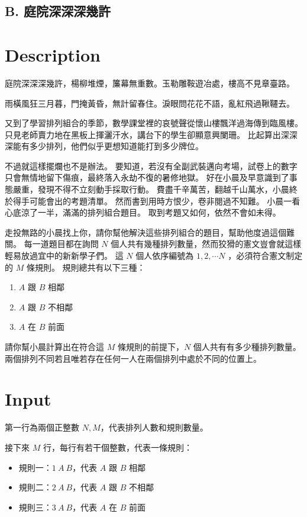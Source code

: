 \documentclass[11pt,a4paper]{article}
\begin{document}
\begin{center}
\section*{B. 庭院深深深幾許}
\end{center}

\section*{Description}

庭院深深深幾許，楊柳堆煙，簾幕無重數。玉勒雕鞍遊冶處，樓高不見章臺路。

雨橫風狂三月暮，門掩黃昏，無計留春住。淚眼問花花不語，亂紅飛過鞦韆去。

\vspace{1cm}
又到了學習排列組合的季節，數學課堂裡的哀號聲從懷山樓飄洋過海傳到臨風樓。
只見老師賣力地在黑板上揮灑汗水，講台下的學生卻顯意興闌珊。
比起算出深深深能有多少排列，他們似乎更想知道能打到多少牌位。

不過就這樣擺爛也不是辦法。
要知道，若沒有全副武裝邁向考場，試卷上的數字只會無情地留下傷痕，最終落入永劫不復的暑修地獄。
好在小晨及早意識到了事態嚴重，發現不得不立刻動手採取行動。
費盡千辛萬苦，翻越千山萬水，小晨終於得手可能會出的考題清單。
然而書到用時方恨少，卷非閱過不知難。
小晨一看心底涼了一半，滿滿的排列組合題目。
取到考題又如何，依然不會如未得。

走投無路的小晨找上你，請你幫他解決這些排列組合的題目，幫助他度過這個難關。
每一道題目都在詢問 $N$ 個人共有幾種排列數量，然而狡猾的憲文豈會就這樣輕易放過宜中的新新學子們。
這 $N$ 個人依序編號為 $1, 2, \cdots N$ ，必須符合憲文制定的 $M$ 條規則。
規則總共有以下三種：
\begin{enumerate}
	\item $A$ 跟 $B$ 相鄰
	\item $A$ 跟 $B$ 不相鄰
	\item $A$ 在 $B$ 前面
\end{enumerate}
請你幫小晨計算出在符合這 $M$ 條規則的前提下，$N$ 個人共有有多少種排列數量。
兩個排列不同若且唯若存在任何一人在兩個排列中處於不同的位置上。


\section*{Input}

第一行為兩個正整數 $N, M$，代表排列人數和規則數量。

接下來 $M$ 行，每行有若干個整數，代表一條規則：
\begin{itemize}
  \item 規則一：$1\ A\ B$，代表 $A$ 跟 $B$ 相鄰
  \item 規則二：$2\ A\ B$，代表 $A$ 跟 $B$ 不相鄰
  \item 規則三：$3\ A\ B$，代表 $A$ 在 $B$ 前面
\end{itemize}
\end{document}
